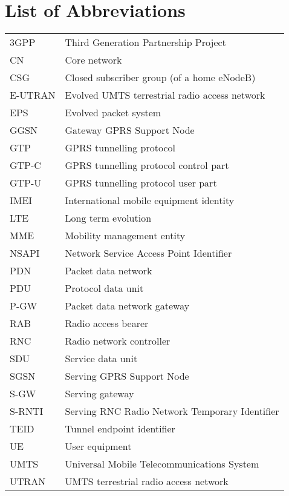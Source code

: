 \documentclass[12pt, a4paper]{article}
\begin{document}
\clearpage
\section*{List of Abbreviations}
\begin{tabular}{ p{4cm} l }
 3GPP & Third Generation Partnership Project \\
 CN & Core network \\
 CSG & Closed subscriber group (of a home eNodeB) \\
 E-UTRAN & Evolved UMTS terrestrial radio access network \\
 EPS & Evolved packet system \\
 GGSN & Gateway GPRS Support Node \\
 GTP & GPRS tunnelling protocol \\
 GTP-C & GPRS tunnelling protocol control part \\
 GTP-U & GPRS tunnelling protocol user part \\
 IMEI & International mobile equipment identity \\
 LTE & Long term evolution \\
 MME & Mobility management entity \\
 NSAPI & Network Service Access Point Identifier \\
 PDN & Packet data network \\
 PDU & Protocol data unit \\
 P-GW & Packet data network gateway \\
 RAB & Radio access bearer \\
 RNC & Radio network controller \\
 SDU & Service data unit \\
 SGSN & Serving GPRS Support Node \\
 S-GW & Serving gateway \\
 S-RNTI & Serving RNC Radio Network Temporary Identifier \\
 TEID & Tunnel endpoint identifier \\
 UE & User equipment \\
 UMTS & Universal Mobile Telecommunications System \\
 UTRAN & UMTS terrestrial radio access network \\


\end{tabular}

\clearpage
\end{document}
